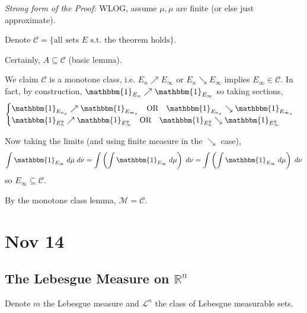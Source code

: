\documentclass[12pt]{report}
\newcommand{\R}{\mathbb{R}}
\newcommand{\ind}{\mathbbm{1}}
\newcommand{\Cc}{\mathcal{C}}
\newcommand{\M}{\mathcal{M}}
\renewcommand{\L}{\mathcal{L}}
\newcommand{\sub}{\subseteq}
\newenvironment*{tbox}[2][gray]{
    \begin{tcolorbox}[
        parbox=false,
        colback=#1!5!white,
        colframe=#1!75!black,
        breakable,
        title={#2}
    ]}
    {\end{tcolorbox}}
\begin{document}
    \begin{tbox}{\textbf{Tonelli Theorem}: 
        \[\int \ind_E \; d\mu \; d\nu = \int \left(\int \ind_E \; d\mu\right) \; d\nu = \int \left(\int \ind_E \; d\mu\right) \; d\nu\]}
        \emph{Strong form of the Proof:} WLOG, assume $\mu, \mu$ are finite (or else just approximate). 
        
        Denote $\Cc = \{\text{all sets } E \text{ s.t. the theorem holds}\}$.

        Certainly, $A \sub \Cc$ (basic lemma). 

        We claim $\Cc$ is a monotone class, i.e. $E_n \nearrow E_{\infty}$ or $E_n \searrow E_{\infty}$ implies $E_{\infty} \in \Cc$. In fact, by construction, $\ind_{E_n} \nearrow \ind_{E_{\infty}}$ so taking sections, 
        \[\begin{cases}
            \ind_{E_{n_x}} \nearrow \ind_{E_{\infty_x}} \quad \text{OR} \quad \ind_{E_{n_x}} \searrow \ind_{E_{\infty_x}}\\ 
            \ind_{E_{n}^y} \nearrow \ind_{E_{\infty}^y} \quad \text{OR} \quad \ind_{E_n^y} \searrow \ind_{E_{\infty}^y}
        \end{cases}\]
        
        Now taking the limits (and using finite measure in the $\searrow$ case), 
        \[\int \ind_{E_{\infty}} \; d\mu \; d\nu = \int \left(\int \ind_{E_{\infty}} \; d\mu\right) \; d\nu = \int \left(\int \ind_{E_{\infty}} \; d\mu\right) \; d\nu\] 
        so $E_{\infty} \sub \Cc$. 

        By the monotone class lemma, $\M = \Cc$. 

    \end{tbox}

\section{Nov 14}
\subsection{The Lebesgue Measure on $\R^n$}
    Denote $m$ the Lebesgue measure and $\L^n$ the class of Lebesgue measurable sets.
\end{document}
